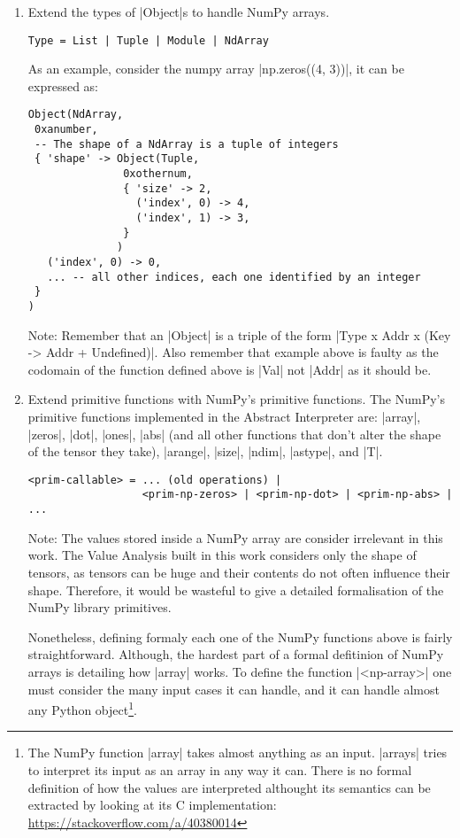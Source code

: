 \begin{enumerate}
\def\labelenumi{\arabic{enumi}.}
\item
  Extend the types of \pycode|Object|s to handle NumPy arrays.

\begin{verbatim}
Type = List | Tuple | Module | NdArray
\end{verbatim}

  As an example, consider the numpy array \pycode|np.zeros((4, 3))|, it
  can be expressed as:

\begin{verbatim}
Object(NdArray,
 0xanumber,
 -- The shape of a NdArray is a tuple of integers
 { 'shape' -> Object(Tuple,
               0xothernum,
               { 'size' -> 2,
                 ('index', 0) -> 4,
                 ('index', 1) -> 3,
               }
              )
   ('index', 0) -> 0,
   ... -- all other indices, each one identified by an integer
 }
)
\end{verbatim}

  Note: Remember that an \pycode|Object| is a triple of the form
  \pycode|Type x Addr x (Key -> Addr + Undefined)|.
  Also remember that example above is faulty as the codomain of the
  function defined above is \pycode|Val| not \pycode|Addr| as it should
  be.
\item
  Extend primitive functions with NumPy's primitive functions. The
  NumPy's primitive functions implemented in the Abstract Interpreter
  are: \pycode|array|, \pycode|zeros|, \pycode|dot|, \pycode|ones|,
  \pycode|abs| (and all other functions that don't alter the shape of
  the tensor they take), \pycode|arange|, \pycode|size|, \pycode|ndim|,
  \pycode|astype|, and \pycode|T|.

\begin{verbatim}
<prim-callable> = ... (old operations) |
                  <prim-np-zeros> | <prim-np-dot> | <prim-np-abs> | ...
\end{verbatim}

  Note: The values stored inside a NumPy array are consider irrelevant
  in this work. The Value Analysis built in this work considers only the
  shape of tensors, as tensors can be huge and their contents do not
  often influence their shape. Therefore, it would be wasteful to give a
  detailed formalisation of the NumPy library primitives.

  Nonetheless, defining formaly each one of the NumPy functions above is
  fairly straightforward. Although, the hardest part of a formal
  defitinion of NumPy arrays is detailing how \pycode|array| works. To
  define the function \pycode|<np-array>| one
  must consider the many input cases it can handle, and it can handle
  almost any Python object\footnote{The NumPy function \pycode|array|
    takes almost anything as an input. \pycode|arrays| tries to
    interpret its input as an array in any way it can. There is no
    formal definition of how the values are interpreted althought its
    semantics can be extracted by looking at its C implementation:
    \url{https://stackoverflow.com/a/40380014}}.


\end{enumerate}
